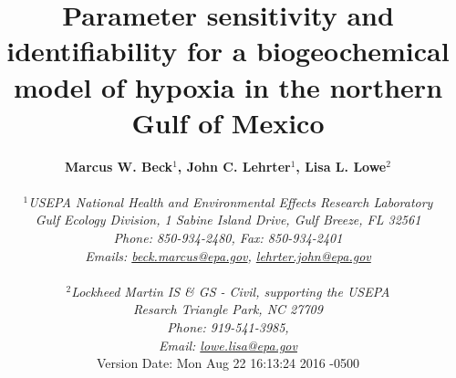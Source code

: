 \documentclass[letterpaper,12pt,oneside]{article}\usepackage[]{graphicx}\usepackage[]{color}
\begin{document}
\raggedbottom
\linenumbers
\raggedright
{}
\setlength{\parindent}{0.5in}
\renewcommand\refname{References \vspace{12pt}}

\begin{singlespace}
\title{{\bf {\Large Parameter sensitivity and identifiability for a biogeochemical model of hypoxia in the northern {G}ulf of {M}exico}}}
\author{
  {\bf {\normalsize Marcus W. Beck$^1$, John C. Lehrter$^1$, Lisa L. Lowe$^2$}}
  \\\\{\textit {\normalsize $^1$USEPA National Health and Environmental Effects Research Laboratory}}
  \\{\textit {\normalsize Gulf Ecology Division, 1 Sabine Island Drive, Gulf Breeze, FL 32561}}
	\\{\textit {\normalsize Phone: 850-934-2480, Fax: 850-934-2401}}
	\\{\textit {\normalsize Emails: \href{mailto:beck.marcus@epa.gov}{beck.marcus@epa.gov}, \href{mailto:lehrter.john@epa.gov}{lehrter.john@epa.gov}}}
	\\\\{\textit {\normalsize $^2$Lockheed Martin IS \& GS - Civil, supporting the USEPA}}
	\\{\textit {\normalsize Resarch Triangle Park, NC 27709}}
	\\{\textit {\normalsize Phone: 919-541-3985,}}
	\\{\textit {\normalsize Email: \href{mailto:lowe.lisa@epa.gov}{lowe.lisa@epa.gov}}}
  \vspace{1in} 
  \\ Version Date:   Mon Aug 22 16:13:24 2016 -0500
	}
\date{}
\maketitle
\end{singlespace}
\clearpage
\end{document}
